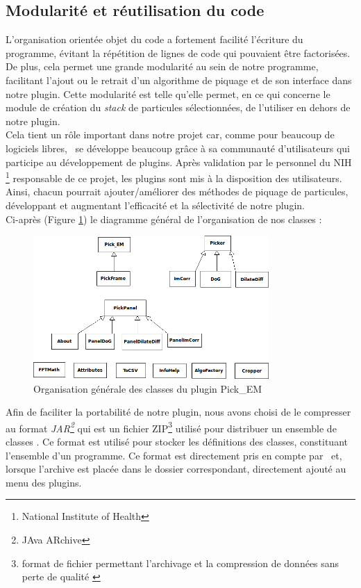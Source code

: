 \subsection{Modularité et réutilisation du code}

L'organisation orientée objet du code a fortement facilité l'écriture du programme, évitant la répétition de lignes de code qui pouvaient \^etre factorisées. De plus, cela permet une grande modularité au sein de notre programme, facilitant l'ajout ou le retrait d'un algorithme de piquage et de son interface dans notre plugin. Cette modularité est telle qu'elle permet, en ce qui concerne le module de création du \textit{stack} de particules sélectionnées, de l'utiliser en dehors de notre plugin.\\
Cela tient un rôle important dans notre projet car, comme pour beaucoup de logiciels libres, \imj ~se développe beaucoup gr\^ace à sa communauté d'utilisateurs qui participe au développement de plugins. Après validation par le personnel du NIH \footnote{National Institute of Health} responsable de ce projet, les plugins sont mis à la disposition des utilisateurs. Ainsi, chacun pourrait ajouter/améliorer des méthodes de piquage de particules, développant et augmentant l'efficacité et la sélectivité de notre plugin. \\

Ci-après (Figure \ref{classes}) le diagramme général de l'organisation de nos classes :

\begin{figure}[!h] 
\begin{center}
\includegraphics[width=0.8\textwidth]{class_diagram.png}
\caption{Organisation générale des classes du plugin Pick\_EM}
\label{classes}
\end{center}
\end{figure}

Afin de faciliter la portabilité de notre plugin, nous avons choisi de le compresser au format \emph{JAR\footnote{JAva ARchive\cite{jar:url}}} qui est un fichier ZIP\footnote{format de fichier permettant l'archivage et la compression de données sans perte de qualité \cite{zip:url}} utilisé pour distribuer un ensemble de classes \java. Ce format est utilisé pour stocker les définitions des classes, constituant l'ensemble d'un programme.
Ce format est directement pris en compte par \imj ~et, lorsque l'archive est placée dans le dossier correspondant, directement ajouté au menu des plugins.\\

